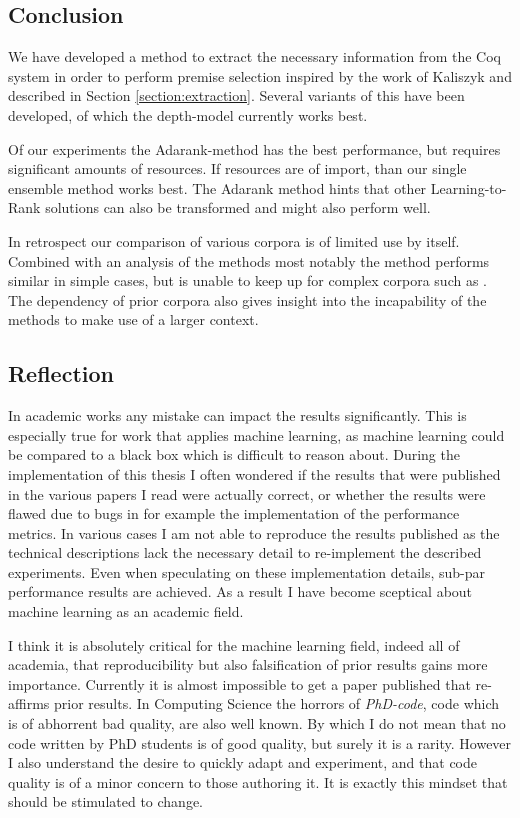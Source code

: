 \subsection{Conclusion}
We have developed a method to extract the necessary information from the Coq system in order to perform premise selection
inspired by the work of Kaliszyk and described in Section \ref{section:extraction}.
Several variants of this have been developed, of which the depth-model currently works best.

Of our experiments the Adarank-method has the best performance, but requires significant amounts of resources.
If resources are of import, than our single ensemble method works best.
The Adarank method hints that other Learning-to-Rank solutions can also be transformed and might also perform well.

In retrospect our comparison of various corpora is of limited use by itself.
Combined with an analysis of the methods most notably the \knnadaptive method performs similar in simple cases,
but is unable to keep up for complex corpora such as \corn.
The dependency of prior corpora also gives insight into the incapability of the methods to make use
of a larger context.

\subsection{Reflection}
In academic works any mistake can impact the results significantly.
This is especially true for work that applies machine learning, as machine learning could be compared to a black box which
is difficult to reason about.
During the implementation of this thesis I often wondered if the results that were published in the various papers I read
were actually correct, or whether the results were flawed due to bugs in for example the implementation of the
performance metrics.
In various cases I am not able to reproduce the results published as the technical descriptions lack the necessary detail
to re-implement the described experiments.
Even when speculating on these implementation details, sub-par performance results are achieved.
As a result I have become sceptical about machine learning as an academic field.

I think it is absolutely critical for the machine learning field, indeed all of academia,
that reproducibility but also falsification of prior results gains more importance.
Currently it is almost impossible to get a paper published that re-affirms prior results.
In Computing Science the horrors of \emph{PhD-code}, code which is of abhorrent bad quality, are also well known.
By which I do not mean that no code written by PhD students is of good quality, but surely it is a rarity.
However I also understand the desire to quickly adapt and experiment, and that code quality is of a minor concern to those authoring it.
It is exactly this mindset that should be stimulated to change.

